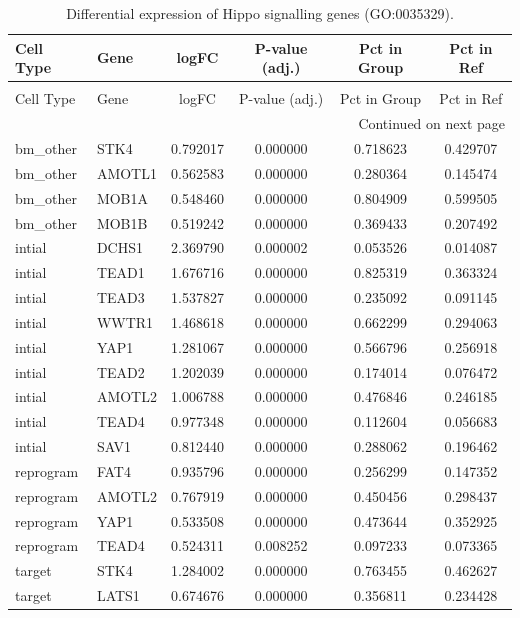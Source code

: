 \begin{longtable}{llcccc}
\caption{Differential expression of Hippo signalling genes (GO:0035329).} \label{tab:hippo_deg_ourdata} \\
\toprule
Cell Type & Gene & logFC & P-value (adj.) & Pct in Group & Pct in Ref \\
\midrule
\endfirsthead
\caption[]{Differential expression of Hippo signalling genes (GO:0035329).} \\
\toprule
Cell Type & Gene & logFC & P-value (adj.) & Pct in Group & Pct in Ref \\
\midrule
\endhead
\midrule
\multicolumn{6}{r}{Continued on next page} \\
\midrule
\endfoot
\bottomrule
\endlastfoot
bm_other & STK4 & 0.792017 & 0.000000 & 0.718623 & 0.429707 \\
bm_other & AMOTL1 & 0.562583 & 0.000000 & 0.280364 & 0.145474 \\
bm_other & MOB1A & 0.548460 & 0.000000 & 0.804909 & 0.599505 \\
bm_other & MOB1B & 0.519242 & 0.000000 & 0.369433 & 0.207492 \\
intial & DCHS1 & 2.369790 & 0.000002 & 0.053526 & 0.014087 \\
intial & TEAD1 & 1.676716 & 0.000000 & 0.825319 & 0.363324 \\
intial & TEAD3 & 1.537827 & 0.000000 & 0.235092 & 0.091145 \\
intial & WWTR1 & 1.468618 & 0.000000 & 0.662299 & 0.294063 \\
intial & YAP1 & 1.281067 & 0.000000 & 0.566796 & 0.256918 \\
intial & TEAD2 & 1.202039 & 0.000000 & 0.174014 & 0.076472 \\
intial & AMOTL2 & 1.006788 & 0.000000 & 0.476846 & 0.246185 \\
intial & TEAD4 & 0.977348 & 0.000000 & 0.112604 & 0.056683 \\
intial & SAV1 & 0.812440 & 0.000000 & 0.288062 & 0.196462 \\
reprogram & FAT4 & 0.935796 & 0.000000 & 0.256299 & 0.147352 \\
reprogram & AMOTL2 & 0.767919 & 0.000000 & 0.450456 & 0.298437 \\
reprogram & YAP1 & 0.533508 & 0.000000 & 0.473644 & 0.352925 \\
reprogram & TEAD4 & 0.524311 & 0.008252 & 0.097233 & 0.073365 \\
target & STK4 & 1.284002 & 0.000000 & 0.763455 & 0.462627 \\
target & LATS1 & 0.674676 & 0.000000 & 0.356811 & 0.234428 \\
\end{longtable}
